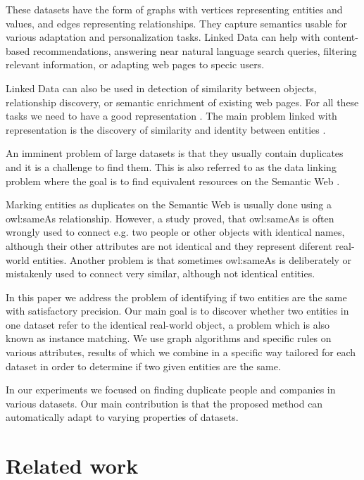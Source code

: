 \documentclass{llncs}
\begin{document}
These datasets have the form of graphs with vertices representing entities
and values, and edges representing relationships. They capture semantics usable
for various adaptation and personalization tasks. Linked Data can help with
content-based recommendations, answering near natural language search queries,
filtering relevant information, or adapting web pages to specic users.

Linked Data can also be used in detection of similarity between objects,
relationship discovery, or semantic enrichment of existing web pages. For all these
tasks we need to have a good representation \cite{harth2012database}.
The main problem linked with
representation is the discovery of similarity and identity between entities \cite{weikum2010information}.

An imminent problem of large datasets is that they usually contain duplicates
and it is a challenge to find them. This is also referred to as the data linking
problem where the goal is to find equivalent resources on the Semantic Web \cite{daskalaki2014instance}.

Marking entities as duplicates on the Semantic Web is usually done using a
owl:sameAs relationship. However, a study \cite{halpin2010owl} proved, that owl:sameAs is often
wrongly used to connect e.g. two people or other objects with identical names,
although their other attributes are not identical and they represent diferent real-
world entities. Another problem is that sometimes owl:sameAs is deliberately or
mistakenly used to connect very similar, although not identical entities.

In this paper we address the problem of identifying if two entities are the same
with satisfactory precision. Our main goal is to discover whether two entities in
one dataset refer to the identical real-world object, a problem which is also
known as instance matching. We use graph algorithms and specific rules on
various attributes, results of which we combine in a specific way tailored for
each dataset in order to determine if two given entities are the same.

In our experiments we focused on finding duplicate people and companies
in various datasets. Our main contribution is that the proposed method can
automatically adapt to varying properties of datasets.

\section{Related work}
\end{document}
